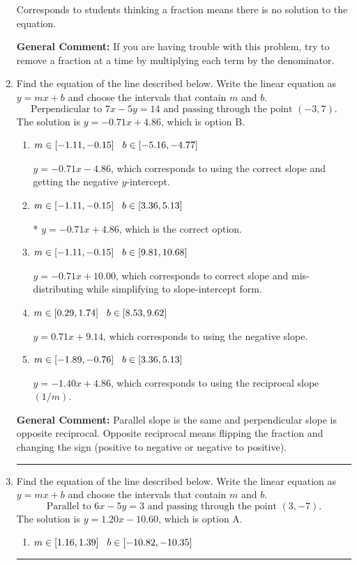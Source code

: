 \documentclass{extbook}[14pt]
\newcommand{\litem}[1]{\item #1

\rule{\textwidth}{0.4pt}}
\begin{document}
\begin{enumerate}
{\begin{enumerate}[label=\Alph*.]
Corresponds to students thinking a fraction means there is no solution to the equation.
\end{enumerate}

\textbf{General Comment:} If you are having trouble with this problem, try to remove a fraction at a time by multiplying each term by the denominator.
}
\litem{
Find the equation of the line described below. Write the linear equation as $ y=mx+b $ and choose the intervals that contain $m$ and $b$.
\[ \text{Perpendicular to } 7 x - 5 y = 14 \text{ and passing through the point } (-3, 7). \]
The solution is \( y = -0.71x + 4.86 \), which is option B.\begin{enumerate}[label=\Alph*.]
\item \( m \in [-1.11, -0.15] \hspace*{3mm} b \in [-5.16, -4.77] \)

 $y = -0.71x - 4.86$, which corresponds to using the correct slope and getting the negative $y$-intercept.
\item \( m \in [-1.11, -0.15] \hspace*{3mm} b \in [3.36, 5.13] \)

* $y = -0.71x + 4.86$, which is the correct option.
\item \( m \in [-1.11, -0.15] \hspace*{3mm} b \in [9.81, 10.68] \)

 $y = -0.71x + 10.00$, which corresponds to correct slope and mis-distributing while simplifying to slope-intercept form.
\item \( m \in [0.29, 1.74] \hspace*{3mm} b \in [8.53, 9.62] \)

 $y = 0.71x + 9.14$, which corresponds to using the negative slope.
\item \( m \in [-1.89, -0.76] \hspace*{3mm} b \in [3.36, 5.13] \)

 $y = -1.40x + 4.86$, which corresponds to using the reciprocal slope $(1/m)$.
\end{enumerate}

\textbf{General Comment:} Parallel slope is the same and perpendicular slope is opposite reciprocal. Opposite reciprocal means flipping the fraction and changing the sign (positive to negative or negative to positive).
}
\litem{
Find the equation of the line described below. Write the linear equation as $ y=mx+b $ and choose the intervals that contain $m$ and $b$.
\[ \text{Parallel to } 6 x - 5 y = 3 \text{ and passing through the point } (3, -7). \]
The solution is \( y = 1.20x - 10.60 \), which is option A.\begin{enumerate}[label=\Alph*.]
\item \( m \in [1.16, 1.39] \hspace*{3mm} b \in [-10.82, -10.35] \)


\end{enumerate}}
\end{enumerate}
\end{document}
